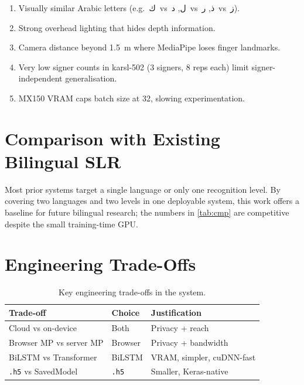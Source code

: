 \begin{enumerate}
  \item Visually similar Arabic letters (e.g.\ \textarabic{ك}~vs~\textarabic{ل},
        \textarabic{د}~vs~\textarabic{ذ}, \textarabic{ر}~vs~\textarabic{ز}).
  \item Strong overhead lighting that hides depth information.
  \item Camera distance beyond \SI{1.5}{\metre} where MediaPipe loses
        finger landmarks.
  \item Very low signer counts in \gls{karsl}-502 (3 signers, 8 reps each)
        limit signer-independent generalisation.
  \item MX150 VRAM caps batch size at 32, slowing experimentation.
\end{enumerate}

\section{Comparison with Existing Bilingual SLR}
\label{sec:disc:cmp}

Most prior systems target a single language or only one recognition level.
By covering two languages and two levels in one deployable system, this
work offers a baseline for future bilingual research; the numbers in
\cref{tab:cmp} are competitive despite the small training-time GPU.

\section{Engineering Trade-Offs}
\label{sec:disc:trade}

\begin{table}[H]\centering
  \caption{Key engineering trade-offs in the system.}\label{tab:trade}
  \begin{tabularx}{\textwidth}{l l X}\toprule
    Trade-off                       & Choice           & Justification \\\midrule
    Cloud vs on-device              & Both             & Privacy + reach \\
    Browser MP vs server MP         & Browser          & Privacy + bandwidth \\
    BiLSTM vs Transformer           & BiLSTM           & VRAM, simpler, cuDNN-fast \\
    \texttt{.h5} vs SavedModel      & \texttt{.h5}     & Smaller, Keras-native \\\bottomrule
  \end{tabularx}
\end{table}

